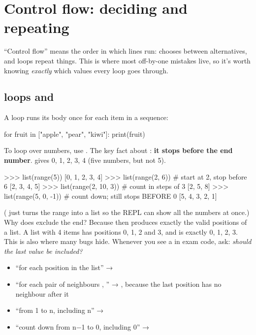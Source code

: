 \documentclass[10pt,a4paper]{article}
\begin{document}
\section{Control flow: deciding and repeating}
“Control flow” means the order in which lines run:  chooses between alternatives, and loops repeat things. This is where most off-by-one mistakes live, so it’s worth knowing \emph{exactly} which values every loop goes through.
\subsection{ loops and }
A  loop runs its body once for each item in a sequence:
\begin{pycode}
for fruit in ["apple", "pear", "kiwi"]:
    print(fruit)
\end{pycode}
To loop over numbers, use . The key fact about : \textbf{it stops before the end number}.  gives 0, 1, 2, 3, 4 (five numbers, but not 5).
\begin{txtcode}
>>> list(range(5))
[0, 1, 2, 3, 4]
>>> list(range(2, 6))        # start at 2, stop before 6
[2, 3, 4, 5]
>>> list(range(2, 10, 3))    # count in steps of 3
[2, 5, 8]
>>> list(range(5, 0, -1))    # count down; still stops BEFORE 0
[5, 4, 3, 2, 1]
\end{txtcode}
( just turns the range into a list so the REPL can show all the numbers at once.)
Why does  exclude the end? Because then  produces exactly the valid positions of a list. A list with 4 items has positions 0, 1, 2 and 3, and  is exactly 0, 1, 2, 3.
This is also where many bugs hide. Whenever you see a  in exam code, ask: \emph{should the last value be included?}
\begin{itemize}
\item “for each position in the list” → 
\item “for each pair of neighbours , ” → , because the last position has no neighbour after it
\item “from 1 to n, including n” → 
\item “count down from n−1 to 0, including 0” → 
\end{itemize}
\end{document}
